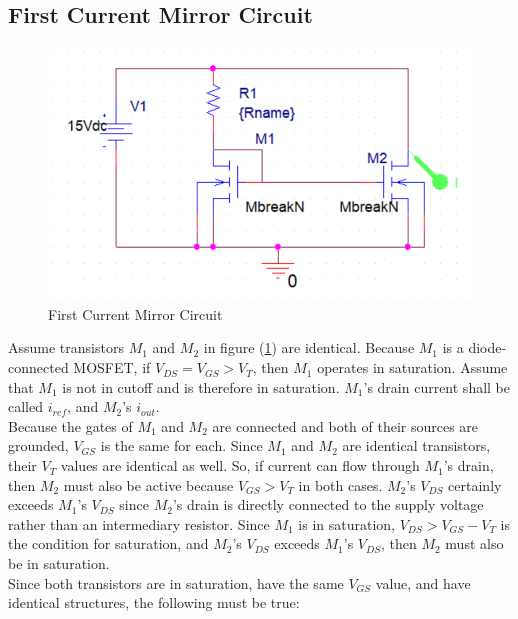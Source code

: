 \subsection{First Current Mirror Circuit}
\FloatBarrier

\begin{figure}[h!]
	\centering
	\includegraphics[scale=0.75]{./images/circuit4.PNG}
	\caption{First Current Mirror Circuit}
	\label{fig:circuit4}
\end{figure}

\FloatBarrier

Assume transistors $M_1$ and $M_2$ in figure (\ref{fig:circuit4}) are identical. Because $M_1$ is a diode-connected MOSFET, if $V_{DS} = V_{GS} > V_T$, then $M_1$ operates in saturation. Assume that $M_1$ is not in cutoff and is therefore in saturation. $M_1$'s drain current shall be called $i_{ref}$, and $M_2$'s $i_{out}$. \\

Because the gates of $M_1$ and $M_2$ are connected and both of their sources are grounded, $V_{GS}$ is the same for each. Since $M_1$ and $M_2$ are identical transistors, their $V_{T}$ values are identical as well. So, if current can flow through $M_1$'s drain, then $M_2$ must also be active because $V_{GS} > V_{T}$ in both cases. $M_2$'s $V_{DS}$ certainly exceeds $M_1$'s $V_{DS}$ since $M_2$'s drain is directly connected to the supply voltage rather than an intermediary resistor. Since $M_1$ is in saturation, $V_{DS} > V_{GS} - V_{T}$ is the condition for saturation, and $M_2$'s $V_{DS}$ exceeds $M_1$'s $V_{DS}$, then $M_2$ must also be in saturation. \\

Since both transistors are in saturation, have the same $V_{GS}$ value, and have identical structures, the following must be true:

